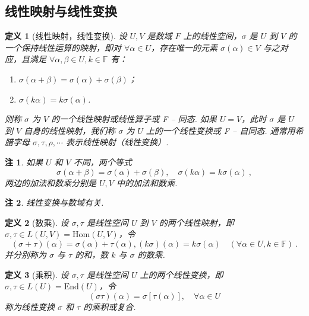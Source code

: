 \documentclass[zihao=-4,UTF8,linespread=1.8,nothm]{aytony_base}
\newtheorem{definition}{\indent 定义}[subsection]
\newtheorem*{remark}{\indent 注}
\begin{document}
\subsection{线性映射与线性变换}

\begin{definition}[线性映射，线性变换]
    设 $U, V$ 是数域 $F$ 上的线性空间，$\sigma$ 是 $U$ 到 $V$ 的一个保持线性运算的映射，即对 $\forall \alpha \in U$，存在唯一的元素 $\sigma(\alpha) \in V$ 与之对应，且满足 $\forall \alpha, \beta \in U, k \in \mathbb{F}$ 有：

    \begin{enumerate}[nosep]
        \item $\sigma(\alpha + \beta) = \sigma(\alpha) + \sigma(\beta)$；
        \item $\sigma(k\alpha) = k\sigma(\alpha)$.
    \end{enumerate}

    则称 $\sigma$ 为 $V$ 的一个线性映射或线性算子或 F -- 同态. 如果 $U = V$，此时 $\sigma$ 是 $U$ 到 $V$ 自身的线性映射，我们称 $\sigma$ 为 $U$ 上的一个线性变换或 F -- 自同态. 通常用希腊字母 $\sigma, \tau, \rho, \cdots$ 表示线性映射（线性变换）.
\end{definition}

\begin{remark}
    如果 $U $ 和 $V$ 不同，两个等式 $$
        \sigma(\alpha + \beta) = \sigma(\alpha) + \sigma(\beta),\quad \sigma(k\alpha) = k\sigma(\alpha)\ ,
    $$ 两边的加法和数乘分别是 $U, V$ 中的加法和数乘.
\end{remark}

\begin{remark}
    线性变换与数域有关.
\end{remark}

\begin{definition}[数乘]
    设 $\sigma, \tau$ 是线性空间 $U$ 到 $V$ 的两个线性映射，即 $\sigma, \tau \in L(U, V) = \mathrm{Hom}(U, V)$，令 $$
        (\sigma + \tau)(\alpha) = \sigma(\alpha) + \tau(\alpha), (k\sigma)(\alpha) = k\sigma(\alpha)\quad (\forall \alpha \in U, k \in \mathbb{F})\ .
    $$ 并分别称为 $\sigma$ 与 $\tau$ 的和，数 $k$ 与 $\sigma$ 的数乘.
\end{definition}

\begin{definition}[乘积]
    设 $\sigma, \tau$ 是线性空间 $U$ 上的两个线性变换，即 $\sigma, \tau \in L(U) = \mathrm{End}(U)$，令 $$
        (\sigma\tau)(\alpha) = \sigma [\tau(\alpha)],\quad \forall \alpha \in U
    $$ 称为线性变换 $\sigma$ 和 $\tau$ 的乘积或复合.
\end{definition}
\end{document}

